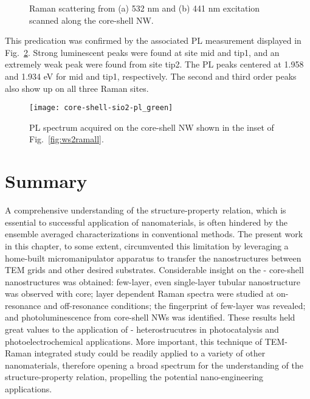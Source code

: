 \begin{figure}[htb]
\centering
{}\hspace{0.04\textwidth}
\caption[Raman scattering from two excitation wavelength]{Raman scattering from (a) 532 nm and (b) 441 nm excitation scanned along the core-shell NW.}
\label{fig:ws2ram3site}
\end{figure}
This predication was confirmed by the associated PL measurement displayed in Fig.~\ref{fig:ws2plgreen}. Strong luminescent peaks were found at site mid and tip1, and an extremely weak peak were found from site tip2. The PL peaks centered at 1.958 and 1.934 eV for mid and tip1, respectively. The second and third order peaks also show up on all three Raman sites. 
\begin{figure}[htb]
\centering
\texttt{[image: core-shell-sio2-pl\_green]}
\caption[PL spectra of - on -Si]{PL spectrum acquired on the core-shell NW shown in the inset of Fig.~\ref{fig:ws2ramall}.}
\label{fig:ws2plgreen}
\end{figure}

\section{Summary} 

A comprehensive understanding of the structure-property relation, which is essential to successful application of nanomaterials, is often hindered by the ensemble averaged characterizations in conventional methods. The present work in this chapter, to some extent, circumvented this limitation by leveraging a home-built micromanipulator apparatus to transfer the nanostructures between TEM grids and other desired substrates. Considerable insight on the - core-shell nanostructures was obtained: few-layer, even single-layer tubular  nanostructure was observed with  core; layer dependent Raman spectra were studied at on-resonance and off-resonance conditions; the fingerprint of few-layer  was revealed; and photoluminescence from core-shell NWs was identified. These results held great values to the application of - heterostrucutres in photocatalysis and photoelectrochemical applications. More important, this technique of TEM-Raman integrated study could be readily applied to a variety of other nanomaterials, therefore opening a broad spectrum for the understanding of the structure-property relation, propelling the potential nano-engineering applications. 

